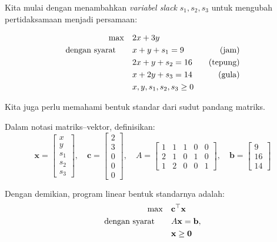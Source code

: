 Kita mulai dengan menambahkan \emph{variabel slack} \( s_1, s_2, s_3 \) untuk mengubah pertidaksamaan menjadi persamaan:

\begin{tcolorbox}[colback=gray!5!white, colframe=gray!75!black,    
    width=0.6\textwidth, %
    box align=center, 
    title=\textbf{Bentuk Standar}]
\[
\begin{aligned}
\max \quad & 2x + 3y \\
\mbox{dengan syarat}\quad \quad 
&x + y + s_1 = 9 \quad &\mbox{(jam)} \\
&2x + y + s_2 = 16 \quad &\mbox{(tepung)} \\
&x + 2y + s_3 = 14 \quad &\mbox{(gula)} \\
&x, y, s_1, s_2, s_3 \geq 0
\end{aligned}
\]
\end{tcolorbox}

Kita juga perlu memahami bentuk standar dari sudut pandang matriks.

\begin{tcolorbox}[colback=gray!5!white, colframe=gray!75!black,    
    width=0.8\textwidth, %
    box align=center, 
    title=\textbf{Bentuk Standar Matriks--Vektor}]
\noindent Dalam notasi matriks--vektor, definisikan:
\[
\mathbf{x} = 
\begin{bmatrix}
x \\
y \\
s_1 \\
s_2 \\
s_3
\end{bmatrix},
\quad
\mathbf{c} =
\begin{bmatrix}
2 \\
3 \\
0 \\
0 \\
0
\end{bmatrix},
\quad
A =
\begin{bmatrix}
1 & 1 & 1 & 0 & 0 \\
2 & 1 & 0 & 1 & 0 \\
1 & 2 & 0 & 0 & 1
\end{bmatrix},
\quad
\mathbf{b} =
\begin{bmatrix}
9 \\
16 \\
14
\end{bmatrix}
\]

\bigskip

\noindent Dengan demikian, program linear bentuk standarnya adalah:
\[
\begin{aligned}
\max \quad & \mathbf{c}^\top \mathbf{x} \\
\mbox{dengan syarat}\quad \quad & A\mathbf{x} = \mathbf{b}, \\
& \mathbf{x} \geq \mathbf{0}
\end{aligned}
\]

\end{tcolorbox}

